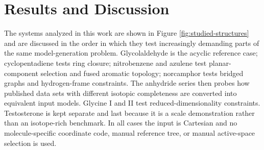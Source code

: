 \documentclass[aip,jcp,reprint,longbibliography,floatfix]{revtex4-2}
\begin{document}
\section{Results and Discussion}

The systems analyzed in this work are shown in Figure \ref{fig:studied-structures}
and are discussed in the order in which  they test increasingly demanding parts of
the same model-generation problem. Glycolaldehyde is
the acyclic reference case; cyclopentadiene tests ring closure; nitrobenzene
and azulene test planar-component selection and fused aromatic topology;
norcamphor tests bridged graphs and hydrogen-frame constraints. The anhydride
series then probes how published data sets with different isotopic
completeness are converted into equivalent input models. Glycine I and II test
reduced-dimensionality constraints. Testosterone is kept separate and last
because it is a scale demonstration rather than an isotope-rich benchmark. In
all cases the input is Cartesian and no molecule-specific coordinate code,
manual reference tree, or manual active-space selection is used.
\end{document}
